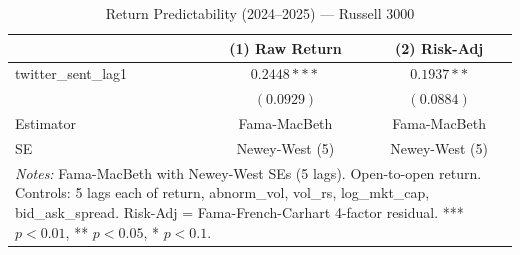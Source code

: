 \begin{table}[htbp]
\centering
\caption{Return Predictability (2024--2025) --- Russell 3000}
\label{tab:russel_2024_t2}
\begin{tabular}{lcc}
\hline\hline
 & (1) Raw Return & (2) Risk-Adj \\
\hline
twitter\_sent\_lag1 & $0.2448***$ & $0.1937**$ \\
                     & $(0.0929)$ & $(0.0884)$ \\
\hline
Estimator & Fama-MacBeth & Fama-MacBeth \\
SE & Newey-West (5) & Newey-West (5) \\
\hline\hline
\multicolumn{3}{p{0.9\linewidth}}{\footnotesize \textit{Notes:} Fama-MacBeth with Newey-West SEs (5 lags). Open-to-open return. Controls: 5 lags each of return, abnorm\_vol, vol\_rs, log\_mkt\_cap, bid\_ask\_spread. Risk-Adj = Fama-French-Carhart 4-factor residual. *** $p<0.01$, ** $p<0.05$, * $p<0.1$.}\n\end{tabular}
\end{table}